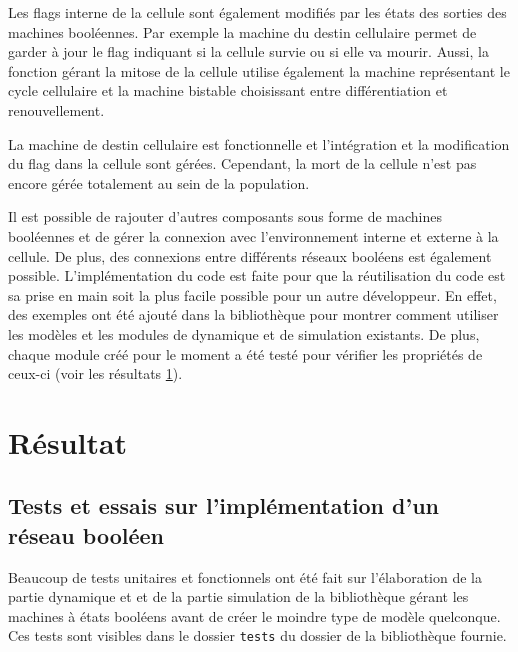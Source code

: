 \documentclass[11pt, a4paper]{article}
\begin{document}
Les flags interne de la cellule sont également modifiés par les états des
sorties des machines booléennes. Par exemple la machine du destin cellulaire
permet de garder à jour le flag indiquant si la cellule survie ou si elle va
mourir. Aussi, la fonction gérant la mitose de la cellule utilise également la
machine représentant le cycle cellulaire et la machine bistable choisissant
entre différentiation et renouvellement.

La machine de destin cellulaire est fonctionnelle et l'intégration et la
modification du flag dans la cellule sont gérées. Cependant, la mort de la cellule
n'est pas encore gérée totalement au sein de la population.

Il est possible de rajouter d'autres composants sous forme de machines
booléennes et de gérer la connexion avec l'environnement interne et externe à
la cellule. De plus, des connexions entre différents réseaux booléens est
également possible. L'implémentation du code est faite pour que la
réutilisation du code est sa prise en main soit la plus facile possible pour un
autre développeur. En effet, des exemples ont été ajouté dans la bibliothèque
pour montrer comment utiliser les modèles et les modules de dynamique et de
simulation existants. De plus, chaque module créé pour le moment a été testé
pour vérifier les propriétés de ceux-ci (voir les résultats
\ref{section_resultat}).

\newpage
\section{Résultat}
\label{section_resultat}
\subsection{Tests et essais sur l'implémentation d'un réseau booléen}
Beaucoup de tests unitaires et fonctionnels ont été fait sur l'élaboration de la
partie dynamique et et de la partie simulation de la bibliothèque gérant les
machines à états booléens avant de créer le moindre type de modèle quelconque.
Ces tests sont visibles dans le dossier \texttt{tests} du dossier de la
bibliothèque fournie.
\end{document}
